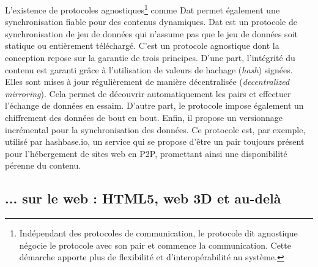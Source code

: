 L'existence de protocoles agnostiques\footnote{Indépendant des 
protocoles de communication, le protocole dit \og agnostique\fg{} négocie le 
protocole avec son pair et commence la communication. Cette démarche 
apporte plus de flexibilité et d'interopérabilité au système.} comme Dat 
\cite{Ogden2017} permet également une synchronisation fiable pour des 
contenus dynamiques. Dat est un protocole de synchronisation de jeu de données 
qui n'assume pas que le jeu de données soit statique ou entièrement téléchargé. 
C'est un protocole agnostique dont la conception repose sur la garantie de 
trois principes. D'une part, l'intégrité du contenu est garanti grâce à 
l'utilisation de valeurs de hachage (\textit{hash}) signées. Elles sont 
mises à jour régulièrement de manière décentralisée (\textit{decentralized mirroring}). 
Cela permet de découvrir automatiquement les pairs et effectuer l'échange de 
données en essaim. D'autre part, le protocole impose également un chiffrement
des données de bout en bout. Enfin, il propose un versionnage incrémental pour la 
synchronisation des données. Ce protocole est, par exemple, utilisé par 
hashbase.io, un service qui se propose d'être un pair toujours présent pour 
l'hébergement de sites web en \gls{P2P}, promettant ainsi une disponibilité 
pérenne du contenu. 


\subsection{... sur le web : HTML5, web 3D et au-delà}

